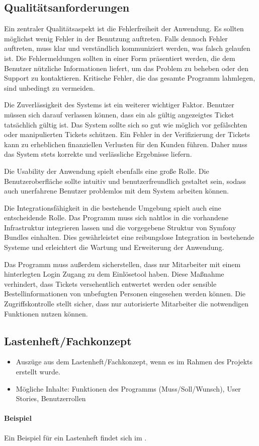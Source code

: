 \subsection{Qualitätsanforderungen}
\label{sec:Qualitaetsanforderungen}

Ein zentraler Qualitätsaspekt ist die Fehlerfreiheit der Anwendung. Es sollten möglichst wenig Fehler in der Benutzung auftreten. Falls dennoch Fehler auftreten, muss klar und verständlich kommuniziert werden, was falsch gelaufen ist. Die Fehlermeldungen sollten in einer Form präsentiert werden, die dem Benutzer nützliche Informationen liefert, um das Problem zu beheben oder den Support zu kontaktieren. Kritische Fehler, die das gesamte Programm lahmlegen, sind unbedingt zu vermeiden.

Die Zuverlässigkeit des Systems ist ein weiterer wichtiger Faktor. Benutzer müssen sich darauf verlassen können, dass ein als gültig angezeigtes Ticket tatsächlich gültig ist. Das System sollte sich so gut wie möglich vor gefälschten oder manipulierten Tickets schützen. Ein Fehler in der Verifizierung der Tickets kann zu erheblichen finanziellen Verlusten für den Kunden führen. Daher muss das System stets korrekte und verlässliche Ergebnisse liefern.

Die Usability der Anwendung spielt ebenfalls eine große Rolle. Die Benutzeroberfläche sollte intuitiv und benutzerfreundlich gestaltet sein, sodass auch unerfahrene Benutzer problemlos mit dem System arbeiten können.

Die Integrationsfähigkeit in die bestehende Umgebung spielt auch eine entscheidende Rolle. Das Programm muss sich nahtlos in die vorhandene Infrastruktur integrieren lassen und die vorgegebene Struktur von Symfony Bundles einhalten. Dies gewährleistet eine reibungslose Integration in bestehende Systeme und erleichtert die Wartung und Erweiterung der Anwendung.

Das Programm muss außerdem sicherstellen, dass nur Mitarbeiter mit einem hinterlegten Login Zugang zu dem Einlösetool haben. Diese Maßnahme verhindert, dass Tickets versehentlich entwertet werden oder sensible Bestellinformationen von unbefugten Personen eingesehen werden können. Die Zugriffskontrolle stellt sicher, dass nur autorisierte Mitarbeiter die notwendigen Funktionen nutzen können.

\subsection{Lastenheft/Fachkonzept}
\label{sec:Lastenheft}
\begin{itemize}
	\item Auszüge aus dem Lastenheft/Fachkonzept, wenn es im Rahmen des Projekts erstellt wurde.
	\item Mögliche Inhalte: Funktionen des Programms (Muss/Soll/Wunsch), User Stories, Benutzerrollen
\end{itemize}

\paragraph{Beispiel}
Ein Beispiel für ein Lastenheft findet sich im . 
